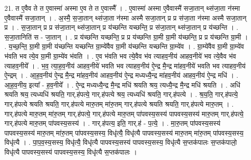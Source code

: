\documentclass[17pt]{extarticle}
\begin{document}
21. त ए॒वैव ते त ए॒वास्मा॑ अस्मा ए॒व ते त ए॒वास्मै᳚ । . ए॒वास्मा॑ अस्मा ए॒वैवास्मै॑ सजा॒तान् थ्स॑जा॒ता न॑स्मा ए॒वैवास्मै॑ सजा॒तान् । . अ॒स्मै॒ स॒जा॒तान् थ्स॑जा॒ता न॑स्मा अस्मै सजा॒तान् प्र प्र स॑जा॒ता न॑स्मा अस्मै सजा॒तान् प्र । . स॒जा॒तान् प्र प्र स॑जा॒तान् थ्स॑जा॒तान् प्र य॑च्छन्ति यच्छन्ति॒ प्र स॑जा॒तान् थ्स॑जा॒तान् प्र य॑च्छन्ति । . स॒जा॒तानिति॑ स - जा॒तान् । . प्र य॑च्छन्ति यच्छन्ति॒ प्र प्र य॑च्छन्ति ग्रा॒मी ग्रा॒मी य॑च्छन्ति॒ प्र प्र य॑च्छन्ति ग्रा॒मी । . य॒च्छ॒न्ति॒ ग्रा॒मी ग्रा॒मी य॑च्छन्ति यच्छन्ति ग्रा॒म्ये॑वैव ग्रा॒मी य॑च्छन्ति यच्छन्ति ग्रा॒म्ये॑व । . ग्रा॒म्ये॑वैव ग्रा॒मी ग्रा॒म्ये॑व भ॑वति भव त्ये॒व ग्रा॒मी ग्रा॒म्ये॑व भ॑वति । . ए॒व भ॑वति भव त्ये॒वैव भ॑व त्याहव॒नीय॑ आहव॒नीये॑ भव त्ये॒वैव भ॑व त्याहव॒नीये᳚ । . भ॒व॒ त्या॒ह॒व॒नीय॑ आहव॒नीये॑ भवति भव त्याहव॒नीय॑ ऐ॒न्द्र मै॒न्द्र मा॑हव॒नीये॑ भवति भव त्याहव॒नीय॑ ऐ॒न्द्रम् । . आ॒ह॒व॒नीय॑ ऐ॒न्द्र मै॒न्द्र मा॑हव॒नीय॑ आहव॒नीय॑ ऐ॒न्द्र मध्यध्यै॒न्द्र मा॑हव॒नीय॑ आहव॒नीय॑ ऐ॒न्द्र मधि॑ । . आ॒ह॒व॒नीय॒ इत्या᳚ - ह॒व॒नीये᳚ । . ऐ॒न्द्र मध्यध्यै॒न्द्र मै॒न्द्र मधि॑ श्रयति श्रय॒ त्यध्यै॒न्द्र मै॒न्द्र मधि॑ श्रयति । . अधि॑ श्रयति श्रय॒ त्यध्यधि॑ श्रयति॒ गार्.ह॑पत्ये॒ गार्.ह॑पत्ये श्रय॒ त्यध्यधि॑ श्रयति॒ गार्.ह॑पत्ये । . श्र॒य॒ति॒ गार्.ह॑पत्ये॒ गार्.ह॑पत्ये श्रयति श्रयति॒ गार्.ह॑पत्ये मारु॒तम् मा॑रु॒तम् गार्.ह॑पत्ये श्रयति श्रयति॒ गार्.ह॑पत्ये मारु॒तम् । . गार्.ह॑पत्ये मारु॒तम् मा॑रु॒तम् गार्.ह॑पत्ये॒ गार्.ह॑पत्ये मारु॒तम् पा॑पवस्य॒सस्य॑ पापवस्य॒सस्य॑ मारु॒तम् गार्.ह॑पत्ये॒ गार्.ह॑पत्ये मारु॒तम् पा॑पवस्य॒सस्य॑ । . गार्.ह॑पत्य॒ इति॒ गार्.ह॑ - प॒त्ये॒ । . मा॒रु॒तम् पा॑पवस्य॒सस्य॑ पापवस्य॒सस्य॑ मारु॒तम् मा॑रु॒तम् पा॑पवस्य॒सस्य॒ विधृ॑त्यै॒ विधृ॑त्यै पापवस्य॒सस्य॑ मारु॒तम् मा॑रु॒तम् पा॑पवस्य॒सस्य॒ विधृ॑त्यै । . पा॒प॒व॒स्य॒सस्य॒ विधृ॑त्यै॒ विधृ॑त्यै पापवस्य॒सस्य॑ पापवस्य॒सस्य॒ विधृ॑त्यै स॒प्तक॑पालः स॒प्तक॑पालो॒ विधृ॑त्यै पापवस्य॒सस्य॑ पापवस्य॒सस्य॒ विधृ॑त्यै स॒प्तक॑पालः । \newline
\end{document}
